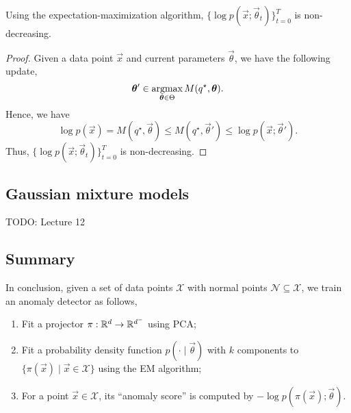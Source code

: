 \begin{theorem}
    Using the expectation-maximization algorithm, $\{ \log p(\vec{x}; \vec{\theta}_t) \}_{t=0}^T$ is non-decreasing.
\end{theorem}

\begin{proof}
    Given a data point $\vec{x}$ and current parameters $\vec{\theta}$, we have the following update, \[
        \bm{\theta}' \in \operatorname*{argmax}_{\bm{\theta} \in \Theta} M(q^\star, \bm{\theta}).
    \]
    Hence, we have \[
        \log p(\vec{x}) = M(q^\star, \vec{\theta}) \leq M(q^\star, \vec{\theta}') \leq \log p(\vec{x}; \vec{\theta}').
    \]
    Thus, $\{ \log p(\vec{x}; \vec{\theta}_t) \}_{t=0}^T$ is non-decreasing.
\end{proof}

\subsection{Gaussian mixture models}

TODO: Lecture 12

\subsection{Summary}

In conclusion, given a set of data points $\mathcal{X}$ with normal points $\mathcal{N} \subseteq
    \mathcal{X}$, we train an anomaly detector as follows,
\begin{enumerate}
    \item Fit a projector $\pi: \mathbb{R}^d \to \mathbb{R}^{d^-}$ using PCA;
    \item Fit a probability density function $p(\cdot \mid \vec{\theta})$ with $k$ components to $\{
              \pi(\vec{x}) \mid \vec{x} \in \mathcal{X} \}$ using the EM algorithm;
    \item For a point $\vec{x} \in \mathcal{X}$, its ``anomaly score'' is computed by $-\log p(\pi(\vec{x});
              \vec{\theta})$.
\end{enumerate}

